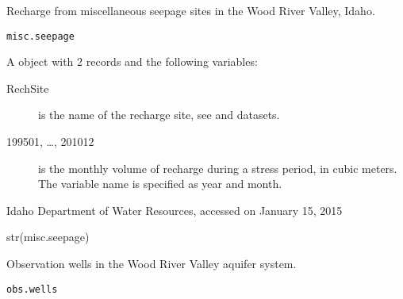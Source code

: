 \documentclass[letterpaper]{book}
\begin{document}
%
\begin{Description}\relax
Recharge from miscellaneous seepage sites in the Wood River Valley, Idaho.
\end{Description}
%
\begin{Usage}
\begin{verbatim}
misc.seepage
\end{verbatim}
\end{Usage}
%
\begin{Format}
A  object with 2 records and the following variables:
\begin{description}

\item[RechSite] is the name of the recharge site, see  and  datasets.
\item[199501, \dots, 201012] is the monthly volume of recharge during a stress period, in cubic meters.
The variable name is specified as year and month.

\end{description}

\end{Format}
%
\begin{Source}\relax
Idaho Department of Water Resources, accessed on January 15, 2015
\end{Source}
%
\begin{Examples}
\begin{ExampleCode}
str(misc.seepage)
\end{ExampleCode}
\end{Examples}
%
\begin{Description}\relax
Observation wells in the Wood River Valley aquifer system.
\end{Description}
%
\begin{Usage}
\begin{verbatim}
obs.wells
\end{verbatim}
\end{Usage}
%
\end{document}
